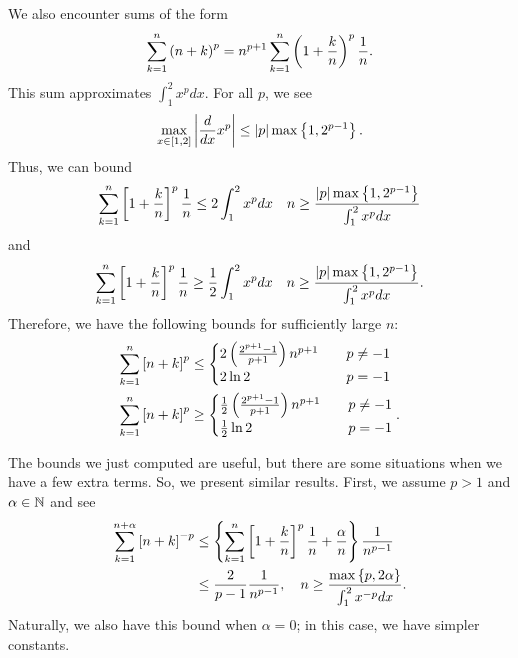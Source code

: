 We also encounter sums of the form
%
\begin{equation}
    \sum_{k=1}^{n} \left( n+k \right)^{p}
        = n^{p+1}\sum_{k=1}^{n}\left( 1 + \frac{k}{n} \right)^{p}\frac{1}{n}.
\end{equation}
%
This sum approximates $\int_{1}^{2}x^{p}dx$. For all $p$, we see
%
\begin{equation}
    \max_{x\in\left[ 1,2 \right]}\left| \frac{d}{dx}x^{p} \right|
        \le \left| p \right|\max\left\{ 1,2^{p-1} \right\}.
\end{equation}
%
Thus, we can bound
%
\begin{equation}
    \sum_{k=1}^{n}\left[ 1+\frac{k}{n} \right]^{p}\frac{1}{n}
        \le 2\int_{1}^{2}x^{p}dx
            \quad n\ge \frac{\left| p \right|\max\left\{ 1,2^{p-1} \right\}}{
            \int_{1}^{2}x^{p}dx}
\end{equation}
%
and
%
\begin{equation}
    \sum_{k=1}^{n}\left[ 1+\frac{k}{n} \right]^{p}\frac{1}{n}
        \ge \frac{1}{2}\int_{1}^{2}x^{p}dx
            \quad n\ge \frac{\left| p \right|\max\left\{ 1,2^{p-1} \right\}}{
            \int_{1}^{2}x^{p}dx}.
\end{equation}
%
Therefore, we have the following bounds for sufficiently large $n$:
%
\begin{align}
    \sum_{k=1}^{n}\left[ n+k \right]^{p} &\le \begin{cases}
        2\left( \frac{2^{p+1}-1}{p+1} \right)n^{p+1} \quad &p\ne-1\\
        2\ln 2 \quad&p=-1
        \end{cases} \nonumber\\
    \sum_{k=1}^{n}\left[ n+k \right]^{p} &\ge \begin{cases}
        \frac{1}{2}\left( \frac{2^{p+1}-1}{p+1} \right)n^{p+1} \quad &p\ne-1\\
        \frac{1}{2}\ln 2 \quad&p=-1
        \end{cases}.
    \label{eq:bound_xp_12}
\end{align}

The bounds we just computed are useful, but there are some situations when
we have a few extra terms. So, we present similar results.
First, we assume $p>1$ and $\alpha\in\mathbb{N}$ and see
%
\begin{align}
    \sum_{k=1}^{n+\alpha}\left[ n+k \right]^{-p}
        &\le \left\{ \sum_{k=1}^{n}\left[ 1+\frac{k}{n} \right]^{p}\frac{1}{n}
            + \frac{\alpha}{n} \right\}\frac{1}{n^{p-1}} \nonumber\\
        &\le \frac{2}{p-1}\frac{1}{n^{p-1}},\quad
            n\ge\frac{\max\left\{ p,2\alpha \right\}}{\int_{1}^{2}x^{-p}dx}.
    \label{eq:ubound_xp_12_pneg}
\end{align}
%
Naturally, we also have this bound when $\alpha=0$; in this case,
we have simpler constants.



